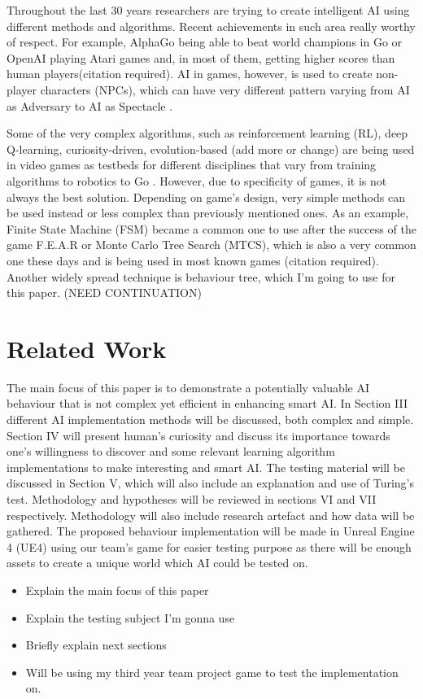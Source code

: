 \documentclass[journal]{IEEEtran}
\begin{document}
Throughout the last 30 years researchers are trying to create intelligent AI using different methods and algorithms. Recent achievements in such area really worthy of respect. For example, AlphaGo being able to beat world champions in Go \cite{alphago} or OpenAI playing Atari games and, in most of them, getting higher scores than human players(citation required). AI in games, however, is used to create non-player characters (NPCs), which can have very different pattern varying from AI as Adversary to AI as Spectacle \cite{treanor2015ai}. 

Some of the very complex algorithms, such as reinforcement learning (RL), deep Q-learning, curiosity-driven, evolution-based (add more or change) are being used in video games as testbeds for different disciplines that vary from training algorithms to robotics to Go \cite{schaul2011measuring}\cite{alphago}\cite{aiinvideogames}. However, due to specificity of games, it is not always the best solution. Depending on game's design, very simple methods can be used instead or less complex than previously mentioned ones. As an example, Finite State Machine (FSM) became a common one to use after the success of the game F.E.A.R or Monte Carlo Tree Search (MTCS), which is also a very common one these days and is being used in most known games (citation required). Another widely spread technique is behaviour tree, which I'm going to use for this paper. (NEED CONTINUATION)

\section{Related Work} %
The main focus of this paper is to demonstrate a potentially valuable AI behaviour that is not complex yet efficient in enhancing smart AI. In Section III different AI implementation methods will be discussed, both complex and simple. Section IV will present human's curiosity and discuss its importance towards one's willingness to discover and some relevant learning algorithm implementations to make interesting and smart AI. The testing material will be discussed in Section V, which will also include an explanation and use of Turing's test. Methodology and hypotheses will be reviewed in sections VI and VII respectively. Methodology will also include research artefact and how data will be gathered. The proposed behaviour implementation will be made in Unreal Engine 4 (UE4) using our team's game for easier testing purpose as there will be enough assets to create a unique world which AI could be tested on.
\begin{itemize}
	\item Explain the main focus of this paper
	\item Explain the testing subject I'm gonna use
	\item Briefly explain next sections
	\item Will be using my third year team project game to test the implementation on.
\end{itemize}
\end{document}
